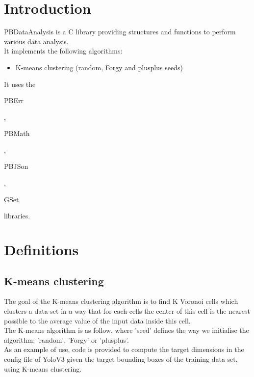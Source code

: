 \section*{Introduction}

PBDataAnalysis is a C library providing structures and functions to perform various data analysis.\\ 

It implements the following algorithms:
\begin{itemize}
\item K-means clustering (random, Forgy and plusplus seeds)
\end{itemize}

It uses the \begin{ttfamily}PBErr\end{ttfamily}, \begin{ttfamily}PBMath\end{ttfamily}, \begin{ttfamily}PBJSon\end{ttfamily}, \begin{ttfamily}GSet\end{ttfamily} libraries.\\

\section{Definitions}

\subsection{K-means clustering}

The goal of the K-means clustering algorithm is to find K Voronoi cells which clusters a data set in a way that for each cells the center of this cell is the nearest possible to the average value of the input data inside this cell.\\

The K-means algorithm is as follow, where 'seed' defines the way we initialise the algorithm: 'random', 'Forgy' or 'plusplus'.\\

As an example of use, code is provided to compute the target dimensions in the config file of YoloV3 given the target bounding boxes of the training data set, using K-means clustering.\\

\begin{scriptsize}
\begin{ttfamily}

\end{ttfamily}
\end{scriptsize}

